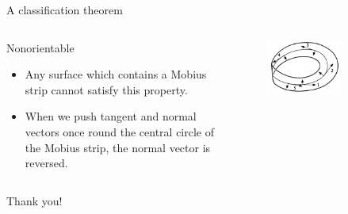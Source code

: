 \documentclass{beamer}
\begin{document}
\begin{frame}{A classification theorem}
  \begin{columns}
    \begin{column}{0.6\textwidth}
      \begin{block}{}
        Nonorientable
        \begin{itemize}
        \item Any surface which contains a Mobius strip cannot satisfy this property.
        \item When we push tangent and normal vectors once round the central circle of the Mobius strip, the normal vector is reversed.
        \end{itemize}
      \end{block}
    \end{column}
    \begin{column}{0.4\textwidth}
      \begin{figure}
        \centering
        \includegraphics[width=0.7\textwidth]{figure_1_19_b.png}
        \caption{}
      \end{figure}
    \end{column}
  \end{columns}
\end{frame}

\begin{frame}
\Huge{\centerline{Thank you!}}
\end{frame}
\end{document}
